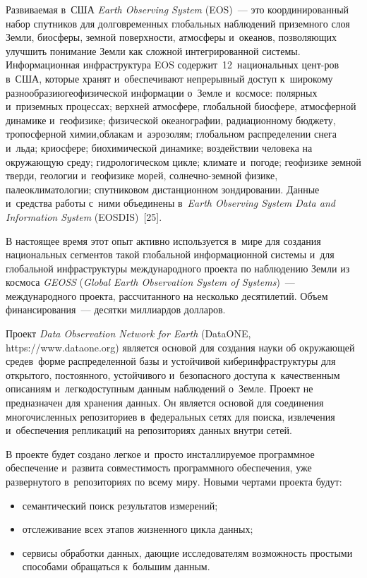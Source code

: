 \begin{multicols}{2}
  Развиваемая в~США \textit{Earth Observing System} (EOS)~--- это координированный 
набор спутников для долговременных глобальных наблюдений приземного слоя Земли, 
биосферы, земной по\-вер\-хности, атмосферы и~океанов, позволяющих улучшить понимание 
Земли как сложной интегрированной системы. Информационная инфраструктура EOS 
содержит~12~национальных цент-\linebreak ров в~США, которые хранят и~обеспечивают 
непрерывный доступ к~широкому разнообразию\linebreak геофизической информации о~Земле 
и~космосе: полярных и~приземных процессах; верхней атмосфере, глобальной биосфере, 
атмосферной динамике и~геофизике; физической океанографии, радиационному бюджету, 
тропосферной химии,\linebreak облакам и~аэрозолям; глобальном распределении снега и~льда; 
криосфере; биохимической динамике; воздействии человека на окружающую среду; 
гид\-ро\-логическом цикле; климате и~погоде; геофизике земной тверди, геологии 
и~геофизике морей, сол\-неч\-но-зем\-ной физике, палеоклиматологии; спутниковом 
дистанционном зондировании. Данные и~средства работы с~ними объединены 
в~\textit{Earth Observing System Data and Information System} (\mbox{EOSDIS})~[25]. 
{ %

}
  
  В настоящее время этот опыт активно используется в~мире для создания национальных 
сегментов такой глобальной информационной системы и~для глобальной инфраструктуры 
международного проекта по наблюдению Земли из космоса \textit{GEOSS} (\textit{Global 
Earth Observation System of Systems})~--- международного проекта, рассчитанного на 
несколько десятилетий. Объем финансирования~--- десятки миллиардов долларов. 
  
  Проект \textit{Data Observation Network for Earth} (DataONE, 
  {\sf https://www.dataone.org}) 
является основой для создания науки об окружающей среде\linebreak в~форме распределенной базы 
и устойчивой киберинфраструктуры для открытого, постоянного, устойчивого 
и~безопасного доступа к~качественным описаниям и~легкодоступным данным наблюдений 
о~Земле. Проект не предназначен для хранения данных. Он является основой для 
соединения многочисленных репозиториев в~федеральных сетях для поиска, 
извлечения и~обеспечения репликаций на репозиториях данных внутри сетей. 
  
  В проекте будет создано легкое и~просто инсталлируемое программное обеспечение 
и~развита совместимость программного обеспечения, уже развернутого в~репозиториях по 
всему миру. Новыми чертами проекта будут:
  \begin{itemize}
\item семантический поиск результатов измерений;
\item отслеживание всех этапов жизненного цикла данных;
\item сервисы обработки данных, дающие исследователям возможность простыми 
способами обращаться к~большим данным.
\end{itemize}


\end{multicols}
